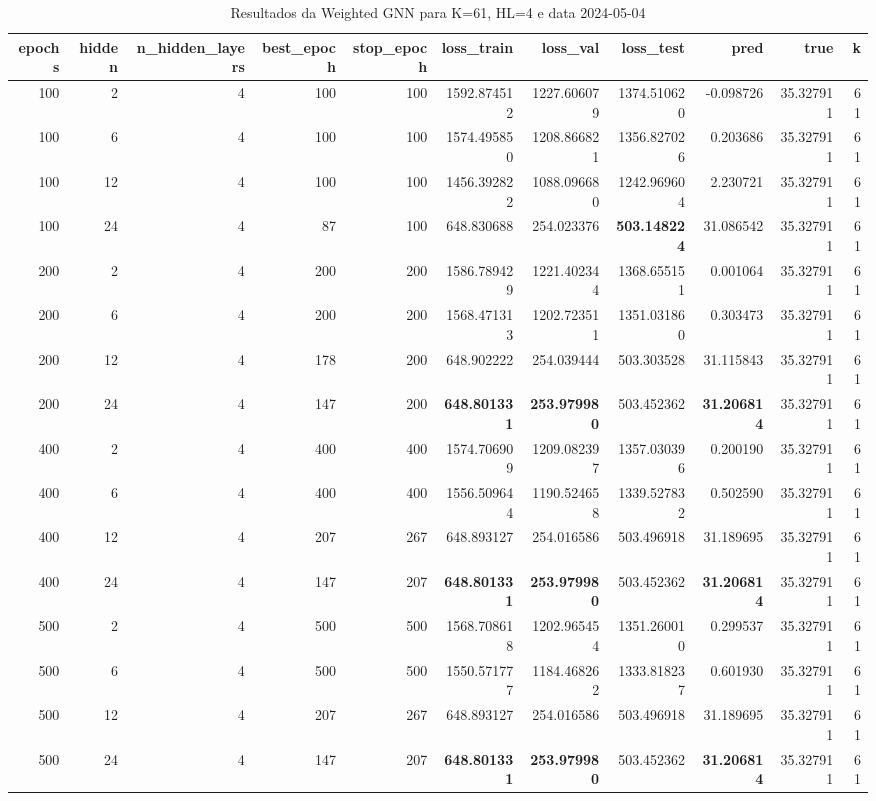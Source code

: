 \begin{table}
\caption{Resultados da Weighted GNN para K=61, HL=4 e data 2024-05-04}
\label{tab:weighted_gnn_results_k61_hl4_d20240504}
\begin{tabular}{rrrrrrrrrrr}
\toprule
epochs & hidden & n\_hidden\_layers & best\_epoch & stop\_epoch & loss\_train & loss\_val & loss\_test & pred & true & k \\
\midrule
100 & 2 & 4 & 100 & 100 & 1592.874512 & 1227.606079 & 1374.510620 & -0.098726 & 35.327911 & 61 \\
100 & 6 & 4 & 100 & 100 & 1574.495850 & 1208.866821 & 1356.827026 & 0.203686 & 35.327911 & 61 \\
100 & 12 & 4 & 100 & 100 & 1456.392822 & 1088.096680 & 1242.969604 & 2.230721 & 35.327911 & 61 \\
100 & 24 & 4 & 87 & 100 & 648.830688 & 254.023376 & \textbf{503.148224} & 31.086542 & 35.327911 & 61 \\
200 & 2 & 4 & 200 & 200 & 1586.789429 & 1221.402344 & 1368.655151 & 0.001064 & 35.327911 & 61 \\
200 & 6 & 4 & 200 & 200 & 1568.471313 & 1202.723511 & 1351.031860 & 0.303473 & 35.327911 & 61 \\
200 & 12 & 4 & 178 & 200 & 648.902222 & 254.039444 & 503.303528 & 31.115843 & 35.327911 & 61 \\
200 & 24 & 4 & 147 & 200 & \textbf{648.801331} & \textbf{253.979980} & 503.452362 & \textbf{31.206814} & 35.327911 & 61 \\
400 & 2 & 4 & 400 & 400 & 1574.706909 & 1209.082397 & 1357.030396 & 0.200190 & 35.327911 & 61 \\
400 & 6 & 4 & 400 & 400 & 1556.509644 & 1190.524658 & 1339.527832 & 0.502590 & 35.327911 & 61 \\
400 & 12 & 4 & 207 & 267 & 648.893127 & 254.016586 & 503.496918 & 31.189695 & 35.327911 & 61 \\
400 & 24 & 4 & 147 & 207 & \textbf{648.801331} & \textbf{253.979980} & 503.452362 & \textbf{31.206814} & 35.327911 & 61 \\
500 & 2 & 4 & 500 & 500 & 1568.708618 & 1202.965454 & 1351.260010 & 0.299537 & 35.327911 & 61 \\
500 & 6 & 4 & 500 & 500 & 1550.571777 & 1184.468262 & 1333.818237 & 0.601930 & 35.327911 & 61 \\
500 & 12 & 4 & 207 & 267 & 648.893127 & 254.016586 & 503.496918 & 31.189695 & 35.327911 & 61 \\
500 & 24 & 4 & 147 & 207 & \textbf{648.801331} & \textbf{253.979980} & 503.452362 & \textbf{31.206814} & 35.327911 & 61 \\

\end{tabular}
\end{table}
